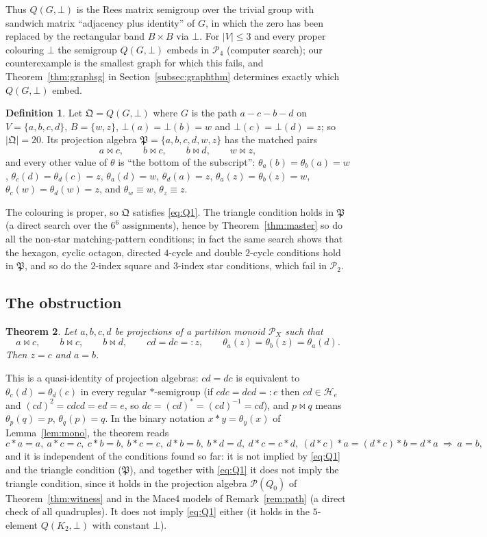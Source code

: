 \documentclass[11pt]{amsart}
\newtheorem{theorem}{Theorem}[section]
\theoremstyle{definition}
\newtheorem{definition}[theorem]{Definition}
\newcommand{\Hh}{\mathcal{H}}
\renewcommand{\P}{\mathcal{P}}
\begin{document}
Thus $Q(G,\bot)$ is the Rees matrix semigroup over the trivial group with sandwich matrix ``adjacency plus identity'' of $G$, in which the zero has been replaced by the rectangular band $B\times B$ via $\bot$. For $|V|\le3$ and every proper colouring $\bot$ the semigroup $Q(G,\bot)$ embeds in $\P_4$ (computer search); our counterexample is the smallest graph for which this fails, and Theorem~\ref{thm:graphsg} in Section~\ref{subsec:graphthm} determines exactly which $Q(G,\bot)$ embed.

\begin{definition}\label{def:Qpath}
Let $\mathfrak Q=Q(G,\bot)$ where $G$ is the path $a-c-b-d$ on $V=\{a,b,c,d\}$, $B=\{w,z\}$, $\bot(a)=\bot(b)=w$ and $\bot(c)=\bot(d)=z$; so $|\mathfrak Q|=20$. Its projection algebra $\mathfrak P=\{a,b,c,d,w,z\}$ has the matched pairs
\[
a\bowtie c,\qquad b\bowtie c,\qquad b\bowtie d,\qquad w\bowtie z,
\]
and every other value of $\theta$ is ``the bottom of the subscript'': $\theta_a(b)=\theta_b(a)=w$, $\theta_c(d)=\theta_d(c)=z$, $\theta_a(d)=w$, $\theta_d(a)=z$, $\theta_a(z)=\theta_b(z)=w$, $\theta_c(w)=\theta_d(w)=z$, and $\theta_w\equiv w$, $\theta_z\equiv z$.
\end{definition}

The colouring is proper, so $\mathfrak Q$ satisfies \eqref{eq:Q1}. The triangle condition holds in $\mathfrak P$ (a direct search over the $6^6$ assignments), hence by Theorem~\ref{thm:master} so do all the non-star matching-pattern conditions; in fact the same search shows that the hexagon, cyclic octagon, directed $4$-cycle and double $2$-cycle conditions hold in $\mathfrak P$, and so do the $2$-index square and $3$-index star conditions, which fail in $\P_2$.

\subsection{The obstruction}

\begin{theorem}\label{thm:wiring}
Let $a,b,c,d$ be projections of a partition monoid $\P_X$ such that
\[
a\bowtie c,\qquad b\bowtie c,\qquad b\bowtie d,\qquad cd=dc=:z,\qquad \theta_a(z)=\theta_b(z)=\theta_a(d).
\]
Then $z=c$ and $a=b$.
\end{theorem}

This is a quasi-identity of projection algebras: $cd=dc$ is equivalent to $\theta_c(d)=\theta_d(c)$ in every regular $*$-semigroup (if $cdc=dcd=:e$ then $cd\in\Hh_e$ and $(cd)^2=cdcd=ed=e$, so $dc=(cd)^*=(cd)^{-1}=cd$), and $p\bowtie q$ means $\theta_p(q)=p$, $\theta_q(p)=q$. In the binary notation $x*y=\theta_y(x)$ of Lemma~\ref{lem:mono}, the theorem reads
\[
c*a=a,\ a*c=c,\ c*b=b,\ b*c=c,\ d*b=b,\ b*d=d,\ d*c=c*d,\ (d*c)*a=(d*c)*b=d*a\ \Longrightarrow\ a=b,
\]
and it is independent of the conditions found so far: it is not implied by \eqref{eq:Q1} and the triangle condition ($\mathfrak P$), and together with \eqref{eq:Q1} it does not imply the triangle condition, since it holds in the projection algebra $\P(Q_0)$ of Theorem~\ref{thm:witness} and in the Mace4 models of Remark~\ref{rem:path} (a direct check of all quadruples). It does not imply \eqref{eq:Q1} either (it holds in the $5$-element $Q(K_2,\bot)$ with constant $\bot$).
\end{document}
